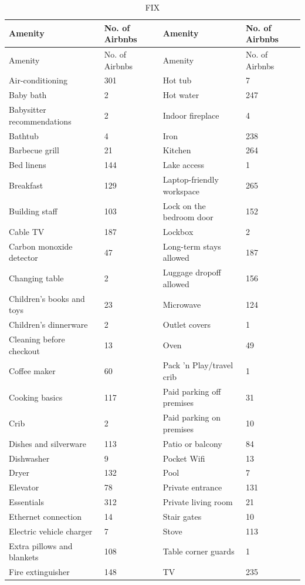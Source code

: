 \documentclass[a4paper, 12pt]{article}
\begin{document}
\begin{longtable}{p{5.5cm}p{2cm}p{5.5cm}p{2cm}}
\caption{FIX} \\
Amenity & No. of Airbnbs & Amenity & No. of Airbnbs \\
\midrule
\endfirsthead
Amenity & No. of Airbnbs & Amenity & No. of Airbnbs \\
\midrule
\endhead
\endfoot
\endlastfoot

Air-conditioning & 301 & Hot tub & 7 \\
Baby bath & 2 & Hot water & 247 \\
Babysitter recommendations & 2 & Indoor fireplace & 4 \\
Bathtub & 4 & Iron & 238 \\
Barbecue grill & 21 & Kitchen & 264 \\
Bed linens & 144 & Lake access & 1 \\
Breakfast & 129 & Laptop-friendly workspace & 265 \\
Building staff & 103 & Lock on the bedroom door & 152 \\
Cable TV & 187 & Lockbox & 2 \\
Carbon monoxide detector & 47 & Long-term stays allowed & 187 \\
Changing table & 2 & Luggage dropoff allowed & 156 \\
Children's books and toys & 23 & Microwave & 124 \\
Children's dinnerware & 2 & Outlet covers & 1 \\
Cleaning before checkout & 13 & Oven & 49 \\
Coffee maker & 60 & Pack 'n Play/travel crib & 1 \\
Cooking basics & 117 & Paid parking off premises & 31 \\
Crib & 2 & Paid parking on premises & 10 \\
Dishes and silverware & 113 & Patio or balcony & 84 \\
Dishwasher & 9 & Pocket Wifi & 13 \\
Dryer & 132 & Pool & 7 \\
Elevator & 78 & Private entrance & 131 \\
Essentials & 312 & Private living room & 21 \\
Ethernet connection & 14 & Stair gates & 10 \\
Electric vehicle charger & 7 & Stove & 113 \\
Extra pillows and blankets & 108 & Table corner guards & 1 \\
Fire extinguisher & 148 & TV & 235 \\

\end{longtable}
\end{document}
